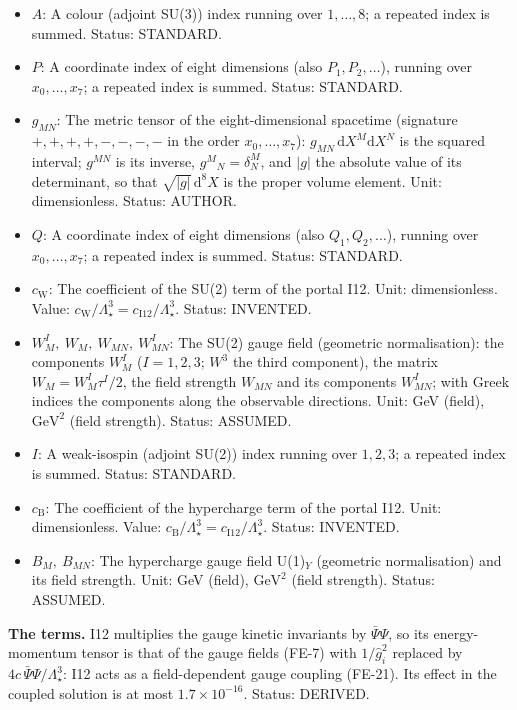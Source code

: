 \documentclass[
  10pt,
]{article}
\begin{document}
\begin{itemize}
\item
  \(A\): A colour (adjoint SU(3)) index running over \(1, \dots, 8\); a
  repeated index is summed. Status: STANDARD.
\item
  \(P\): A coordinate index of eight dimensions (also
  \(P_1, P_2, \dots\)), running over \(x_0, \dots, x_7\); a repeated
  index is summed. Status: STANDARD.
\item
  \(g_{MN}\): The metric tensor of the eight-dimensional spacetime
  (signature \(+,+,+,+,-,-,-,-\) in the order \(x_0, \dots, x_7\)):
  \(g_{MN}\,\mathrm{d}X^M\mathrm{d}X^N\) is the squared interval;
  \(g^{MN}\) is its inverse, \(g^M{}_N = \delta^M_N\), and
  \(\lvert g\rvert\) the absolute value of its determinant, so that
  \(\sqrt{\lvert g\rvert}\,\mathrm{d}^8X\) is the proper volume element.
  Unit: dimensionless. Status: AUTHOR.
\item
  \(Q\): A coordinate index of eight dimensions (also
  \(Q_1, Q_2, \dots\)), running over \(x_0, \dots, x_7\); a repeated
  index is summed. Status: STANDARD.
\item
  \(c_{\mathrm{W}}\): The coefficient of the SU(2) term of the portal
  I12. Unit: dimensionless. Value:
  \(c_{\mathrm{W}}/\Lambda_\star^3 = c_{\mathrm{I12}}/\Lambda_\star^3\).
  Status: INVENTED.
\item
  \(W^I_M,\ W_M,\ W_{MN},\ W^I_{MN}\): The SU(2) gauge field (geometric
  normalisation): the components \(W^I_M\) (\(I = 1, 2, 3\); \(W^3\) the
  third component), the matrix \(W_M = W^I_M\tau^I/2\), the field
  strength \(W_{MN}\) and its components \(W^I_{MN}\); with Greek
  indices the components along the observable directions. Unit: GeV
  (field), \(\mathrm{GeV}^{2}\) (field strength). Status: ASSUMED.
\item
  \(I\): A weak-isospin (adjoint SU(2)) index running over \(1, 2, 3\);
  a repeated index is summed. Status: STANDARD.
\item
  \(c_{\mathrm{B}}\): The coefficient of the hypercharge term of the
  portal I12. Unit: dimensionless. Value:
  \(c_{\mathrm{B}}/\Lambda_\star^3 = c_{\mathrm{I12}}/\Lambda_\star^3\).
  Status: INVENTED.
\item
  \(B_M,\ B_{MN}\): The hypercharge gauge field U(1)\(_Y\) (geometric
  normalisation) and its field strength. Unit: GeV (field),
  \(\mathrm{GeV}^{2}\) (field strength). Status: ASSUMED.
\end{itemize}

\textbf{The terms.} I12 multiplies the gauge kinetic invariants by
\(\bar\Psi\Psi\), so its energy-momentum tensor is that of the gauge
fields (FE-7) with \(1/\hat g_i^2\) replaced by
\(4c\,\bar\Psi\Psi/\Lambda_\star^3\): I12 acts as a field-dependent
gauge coupling (FE-21). Its effect in the coupled solution is at most
\(1.7\times10^{-16}\). Status: DERIVED.
\end{document}
